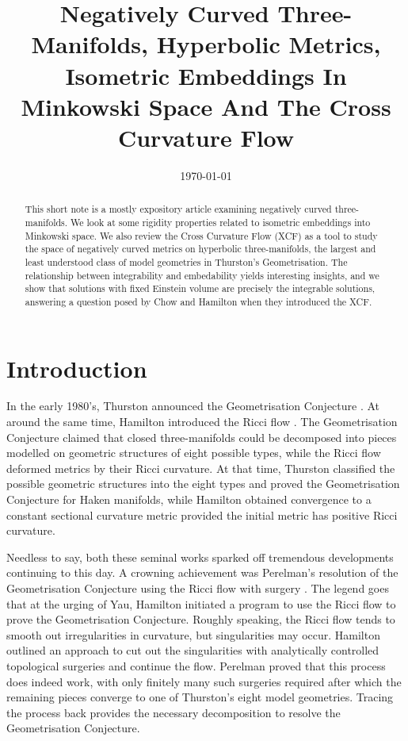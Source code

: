 \documentclass[a4paper,12pt]{amsart}
\begin{document}
\title[Negatively Curved Three Manifolds]{Negatively Curved Three-Manifolds, Hyperbolic Metrics, Isometric Embeddings In Minkowski Space And The Cross Curvature Flow}

\date{\today}



\begin{abstract}
This short note is a mostly expository article examining negatively curved three-manifolds. We look at some rigidity properties related to isometric embeddings into Minkowski space. We also review the Cross Curvature Flow (XCF) as a tool to study the space of negatively curved metrics on hyperbolic three-manifolds, the largest and least understood class of model geometries in Thurston's Geometrisation. The relationship between integrability and embedability yields interesting insights, and we show that solutions with fixed Einstein volume are precisely the integrable solutions, answering a question posed by Chow and Hamilton when they introduced the XCF.
\end{abstract}

\maketitle

\section{Introduction}
\label{sec:intro}

In the early 1980's, Thurston announced the Geometrisation Conjecture \cite{MR648524}. At around the same time, Hamilton introduced the Ricci flow \cite{Hamilton:/1982}. The Geometrisation Conjecture claimed that closed three-manifolds could be decomposed into pieces modelled on geometric structures of eight possible types, while the Ricci flow deformed metrics by their Ricci curvature. At that time, Thurston classified the possible geometric structures into the eight types and proved the Geometrisation Conjecture for Haken manifolds, while Hamilton obtained convergence to a constant sectional curvature metric provided the initial metric has positive Ricci curvature.

Needless to say, both these seminal works sparked off tremendous developments continuing to this day. A crowning achievement was Perelman's resolution of the Geometrisation Conjecture using the Ricci flow with surgery \cite{2003math......7245P,2003math......3109P,2002math.....11159P}. The legend goes that at the urging of Yau, Hamilton initiated a program to use the Ricci flow to prove the Geometrisation Conjecture. Roughly speaking, the Ricci flow  tends to smooth out irregularities in curvature, but singularities may occur. Hamilton outlined an approach to cut out the singularities with analytically controlled topological surgeries and continue the flow. Perelman proved that this process does indeed work, with only finitely many such surgeries required after which the remaining pieces converge to one of Thurston's eight model geometries. Tracing the process back provides the necessary decomposition to resolve the Geometrisation Conjecture.
\end{document}
